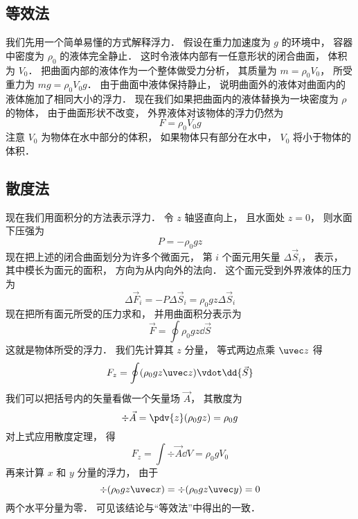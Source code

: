 
\subsection{等效法}

我们先用一个简单易懂的方式解释浮力． 假设在重力加速度为 $g$ 的环境中， 容器中密度为 $\rho_0$ 的液体完全静止． 这时令液体内部有一任意形状的闭合曲面， 体积为 $V_0$． 把曲面内部的液体作为一个整体做受力分析， 其质量为 $m = \rho_0 V_0$， 所受重力为 $mg = \rho_0 V_0 g$． 由于曲面中液体保持静止， 说明曲面外的液体对曲面内的液体施加了相同大小的浮力． 现在我们如果把曲面内的液体替换为一块密度为 $\rho$ 的物体， 由于曲面形状不改变， 外界液体对该物体的浮力仍然为
\begin{equation}
F = \rho_0 V_0 g
\end{equation}
注意 $V_0$ 为物体在水中部分的体积， 如果物体只有部分在水中， $V_0$ 将小于物体的体积．

\subsection{散度法}

现在我们用面积分的方法表示浮力． 令 $z$ 轴竖直向上， 且水面处 $z = 0$， 则水面下压强为
\begin{equation}
P = -\rho_0 g z
\end{equation}
现在把上述的闭合曲面划分为许多个微面元， 第 $i$ 个面元用矢量 $\Delta \vec S_i$， 表示， 其中模长为面元的面积， 方向为从内向外的法向． 这个面元受到外界液体的压力为
\begin{equation}
\Delta \vec F_i = -P\Delta \vec S_i = \rho_0 g z \Delta \vec S_i
\end{equation}
现在把所有面元所受的压力求和， 并用曲面积分表示为
\begin{equation}
\vec F = \oint \rho_0 g z \dd{\vec S}
\end{equation}
这就是物体所受的浮力． 我们先计算其 $z$ 分量， 等式两边点乘 $\uvec z$ 得
\begin{equation}
F_z = \oint (\rho_0 g z \uvec z)\vdot \dd{\vec S}
\end{equation}
我们可以把括号内的矢量看做一个矢量场 $\vec A$， 其散度为
\begin{equation}
\div \vec A = \pdv{z}(\rho_0 g z) = \rho_0 g
\end{equation}
对上式应用散度定理， 得
\begin{equation}
F_z = \int \div\vec A \dd{V} = \rho_0 g V_0
\end{equation}
再来计算 $x$ 和 $y$ 分量的浮力， 由于
\begin{equation}
\div (\rho_0 g z\uvec x) = \div (\rho_0 g z\uvec y) = 0
\end{equation}
两个水平分量为零． 可见该结论与“等效法”中得出的一致．


